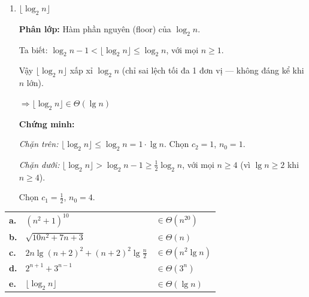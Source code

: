 \documentclass[12pt,a4paper]{article}
\begin{document}
\begin{enumerate}[label=\textbf{\alph*.}]
  $\Longrightarrow \boxed{2^{n+1} + 3^{n-1} \in \Theta(3^n)}$

  \textbf{Chứng minh:}

  \textit{Chặn trên:} Với $n \geq 1$: $2^{n+1} \leq 3^n$ (vì $2^{n+1} = 2 \cdot 2^n \leq 2 \cdot 3^n$). Vậy:
  \[
    2^{n+1} + 3^{n-1} \leq 2 \cdot 3^n + \frac{1}{3} \cdot 3^n = \frac{7}{3} \cdot 3^n.
  \]
  Chọn $c_2 = \frac{7}{3}$, $n_0 = 1$.

  \textit{Chặn dưới:} $2^{n+1} + 3^{n-1} \geq 3^{n-1} = \frac{1}{3} \cdot 3^n$.

  Chọn $c_1 = \frac{1}{3}$, $n_0 = 1$.

  Vậy $\frac{1}{3}\cdot 3^n \leq 2^{n+1} + 3^{n-1} \leq \frac{7}{3}\cdot 3^n$ với mọi $n \geq 1$. \checkmark

  \bigskip

  \item $\lfloor \log_2 n \rfloor$

  \textbf{Phân lớp:} Hàm phần nguyên (floor) của $\log_2 n$.

  Ta biết: $\log_2 n - 1 < \lfloor \log_2 n \rfloor \leq \log_2 n$, với mọi $n \geq 1$.

  Vậy $\lfloor \log_2 n \rfloor$ xấp xỉ $\log_2 n$ (chỉ sai lệch tối đa 1 đơn vị --- không đáng kể khi $n$ lớn).

  $\Longrightarrow \boxed{\lfloor \log_2 n \rfloor \in \Theta(\lg n)}$

  \textbf{Chứng minh:}

  \textit{Chặn trên:} $\lfloor \log_2 n \rfloor \leq \log_2 n = 1 \cdot \lg n$. Chọn $c_2 = 1$, $n_0 = 1$.

  \textit{Chặn dưới:} $\lfloor \log_2 n \rfloor > \log_2 n - 1 \geq \frac{1}{2}\log_2 n$, với mọi $n \geq 4$ (vì $\lg n \geq 2$ khi $n \geq 4$).

  Chọn $c_1 = \frac{1}{2}$, $n_0 = 4$. \checkmark

\end{enumerate}

\begin{resultbox}
\renewcommand{\arraystretch}{1.5}
\begin{tabular}{lll}
  \textbf{a.} & $(n^2+1)^{10}$      & $\in \Theta(n^{20})$ \\
  \textbf{b.} & $\sqrt{10n^2+7n+3}$ & $\in \Theta(n)$ \\
  \textbf{c.} & $2n\lg(n+2)^2 + (n+2)^2\lg\frac{n}{2}$ & $\in \Theta(n^2\lg n)$ \\
  \textbf{d.} & $2^{n+1} + 3^{n-1}$ & $\in \Theta(3^n)$ \\
  \textbf{e.} & $\lfloor\log_2 n\rfloor$ & $\in \Theta(\lg n)$ \\
\end{tabular}
\end{resultbox}
\end{document}
